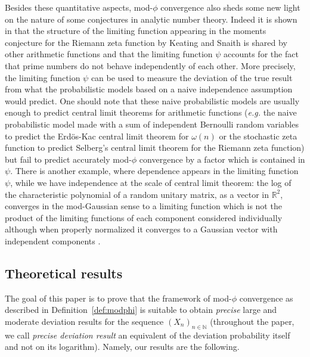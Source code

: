 \documentclass[12pt,a4paper,reqno]{amsart}
\theoremstyle{remark}
\newcommand{\N}{\mathbb{N}}
\begin{document}
Besides these quantitative aspects, mod-$\phi$ convergence also sheds some new light on the nature of some conjectures in analytic number theory. Indeed it is shown in \cite{KN10} that the structure of the limiting function appearing in the moments conjecture for the Riemann zeta function by Keating and Snaith \cite{KS1} is shared by other arithmetic functions and that the limiting function $\psi$ accounts for the fact that prime numbers do not behave independently of each other. More precisely, the limiting function $\psi$ can be used to measure the deviation of the true result from what the  probabilistic models based on a naive independence assumption would predict. One should note that these naive probabilistic models are usually enough to predict central limit theorems for arithmetic functions (\emph{e.g.} the naive probabilistic model made with a sum of independent Bernoulli random variables to predict the Erd\"os-Kac central limit theorem  for $\omega(n)$ or the stochastic zeta function to predict Selberg's central limit theorem for the Riemann zeta function) but fail to predict accurately mod-$\phi$ convergence by a factor which is contained in $\psi$.
There is another example, where dependence appears in the limiting function $\psi$,
while we have independence at the scale of central limit theorem: the log of the characteristic polynomial of a random unitary matrix, as a vector in $\mathbb R^2$, converges in the mod-Gaussian sense to a limiting function which is not the product of the limiting functions of each component considered individually although when properly normalized it converges to a Gaussian vector with independent components \cite{KN12}. 
\bigskip



\subsection{Theoretical results}
The goal of this paper is to prove that the framework of mod-$\phi$ convergence as described in Definition~\ref{def:modphi} is suitable to obtain {\em precise}  large and moderate deviation results for the sequence $(X_n)_{n \in \N}$
(throughout the paper, we call {\em precise deviation result} an equivalent of the deviation probability itself and not on its logarithm). Namely, our results are the following.\vspace{2mm}
\end{document}
